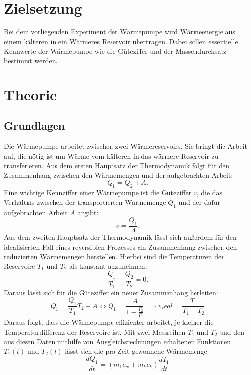 

\section{Zielsetzung}
\label{sec:Theorie}
Bei dem vorliegenden Experiment der Wärmepumpe wird Wärmeenergie aus einem kälteren in ein Wärmeres Reservoir übertragen. Dabei sollen essentielle Kennwerte der Wärmepumpe wie die Güteziffer und der Massendurchsatz bestimmt werden.
\section{Theorie}
\subsection{Grundlagen}
Die Wärmepumpe arbeitet zwischen zwei Wärmereservoirs. Sie bringt die Arbeit auf, die nötig ist um Wärme vom kälteren in das wärmere Reservoir zu transferieren. Aus dem ersten Hauptsatz der Thermodynamik folgt für den Zusammenhang zwischen den Wärmemengen und der aufgebrachten Arbeit:
\begin{equation*}
Q_1=Q_2+A.
\end{equation*}
Eine wichtige Kennziffer einer Wärmepumpe ist die Güteziffer $v$, die das Verhältnis zwischen der transportierten Wärmemenge $Q_1$ und der dafür aufgebrachten Arbeit $A$ angibt:
\begin{equation*}
v=\frac{Q_1}{A}.
\end{equation*}
Aus dem zweiten Hauptsatz der Thermodynamik lässt sich außerdem für den idealisierten Fall eines reversiblen Prozesses ein Zusammenhang zwischen den reduzierten Wärmemengen herstellen. Hierbei sind die Temperaturen der Reservoire $T_1$ und $T_2$ als konstant anzunehmen:
\begin{equation*}
\frac{Q_1}{T_1}-\frac{Q_2}{T_2}=0.
\end{equation*}
Daraus lässt sich für die Güteziffer ein neuer Zusammenhang herleiten:
\begin{equation}
Q_1=\frac{Q_1}{T_1}T_2+A \iff Q_1=\frac{A}{1-\frac{T_2}{T_1}}
\implies v_real=\frac{T_1}{T_1-T_2}
\end{equation}
Daraus folgt, dass die Wärmepumpe effizienter arbeitet, je kleiner die Temperaturdifferenz der Reservoire ist.
Mit zwei Messreihen $T_1$ und $T_2$ und den aus diesen Daten mithilfe von Ausgleichsrechnungen erhaltenen Funktionen $T_1(t)$ und $T_2(t)$ lässt sich die pro Zeit gewonnene Wärmemenge 
\begin{equation}
\frac{dQ_1}{dt}=(m_1c_w+m_kc_k)\frac{dT_1}{dt}
\end{equation}
